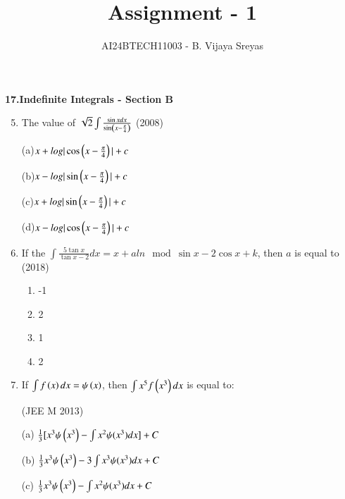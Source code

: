 \documentclass[journal,12pt,twocolumn]{IEEEtran}
\theoremstyle{remark}
\begin{document}

\vspace{3cm}

\title{Assignment - 1}
\author{AI24BTECH11003 - B. Vijaya Sreyas}
\maketitle
\newpage
\bigskip

\renewcommand{\thefigure}{\theenumi}
\renewcommand{\thetable}{\theenumi}

\maketitle\large{\textbf{17.Indefinite Integrals - Section B}}\small

\begin{enumerate}[label=\textcolor{black}{\arabic*.}]
		\setcounter{enumi}{4}
	\item The value of $\sqrt{2}\int\frac{\sin xdx}{\sin \left(x-\frac{\pi}{4}\right)}$
		\hfill{(2008)}

		(a)$x+log|\cos \left(x-\frac{\pi}{4}\right)|+c$

		(b)$x-log|\sin \left(x-\frac{\pi}{4}\right)|+c$

		(c)$x+log|\sin \left(x-\frac{\pi}{4}\right)|+c$

		(d)$x-log|\cos \left(x-\frac{\pi}{4}\right)|+c$

	\item If the $\int\frac{5\tan x}{\tan x-2}dx=x+aln\mod{\sin x-2\cos x}+k$, then $a$ is equal to
		\hfill{(2018)}

		\begin{multicols}{4}
			\begin{enumerate}[label=(\alph*)]
				\item -1
				\item 2
				\item 1
				\item 2
			\end{enumerate}
		\end{multicols}
		
	\item If $\int f\left(x\right)dx=\psi\left(x\right)$, then $\int x^5f\left(x^3\right)dx$ is equal to:

		\hfill{(JEE M 2013)}

		(a) $\frac{1}{3}[x^3\psi\left(x^3\right)-\int x^2\psi(x^3)dx] + C$

		(b) $\frac{1}{3}x^3\psi\left(x^3\right)-3\int x^3\psi(x^3)dx + C$

		(c) $\frac{1}{3}x^3\psi\left(x^3\right)-\int x^2\psi(x^3)dx + C$


\end{enumerate}
\end{document}
